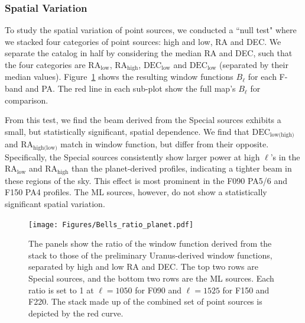 \subsubsection{Spatial Variation}
\label{subsubsec:null_mainbeam}
To study the spatial variation of point sources, we conducted a ``null test" where we stacked four categories of point sources: high and low, RA and DEC.  We separate the catalog in half by considering the median RA and DEC, such that the four categories are $\text{RA}_{\text{low}}$, $\text{RA}_{\text{high}}$, $\text{DEC}_{\text{low}}$ and $\text{DEC}_{\text{low}}$ (separated by their median values). 
 Figure~\ref{fig:bells} shows the resulting window functions $B_{\ell}$ for each F-band and PA.  The red line in each sub-plot show the full map's $B_{\ell}$ for comparison.

From this test, we find the beam derived from the Special sources exhibits a small, but statistically significant, spatial dependence. We find that $\text{DEC}_{\text{low(high)}}$
and $\text{RA}_{\text{high(low)}}$ match in window function, but differ from their opposite. 
 Specifically, the Special sources consistently show larger power at high $\ell$'s in the $\text{RA}_{\text{low}}$ and $\text{RA}_{\text{high}}$ than the planet-derived profiles, indicating a tighter beam in these regions of the sky. This effect is most prominent in the F090 PA5/6 and F150 PA4 profiles. The ML sources, however, do not show a statistically significant spatial variation.

\begin{figure}
    \centering
    \texttt{[image: Figures/Bells\_ratio\_planet.pdf]}
    \caption{The panels show the ratio of the window function derived from the stack to those of the preliminary Uranus-derived window functions, separated by high and low RA and DEC.  The top two rows are Special sources, and the bottom two rows are the ML sources.  Each ratio is set to 1 at $\ell=1050$ for F090 and $\ell=1525$ for F150 and F220.  The stack made up of the combined set of point sources is depicted by the red curve.}
    \label{fig:bells}
\end{figure}

